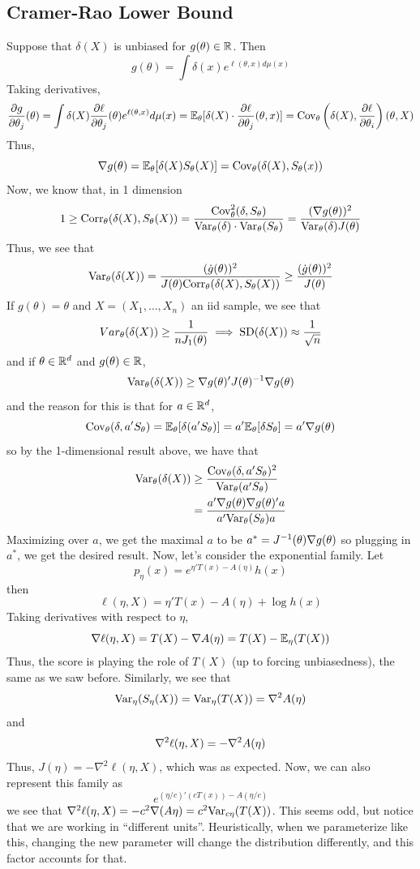 \subsection*{Cramer-Rao Lower Bound}
\sectionspace
Suppose that $\delta(X)$ is unbiased for $g(\theta) \in \R$. Then
\[ g(\theta) = \int \delta(x)e^{\ell(\theta, x)d\mu(x)} \]
Taking derivatives, 
\[ \frac{\del g}{\del \theta_j}(\theta) = \int \delta(X) \frac{\del \ell}{\del \theta_j}(\theta)e^{\ell(\theta, x)}d\mu(x) = \bb{E}_{\theta}[\delta(X) \cdot \frac{\del \ell}{\del \theta_j}(\theta, x)] = \Cov_{\theta}\left(\delta(X), \frac{\del \ell}{\del \theta_i}\right)(\theta, X)\]
Thus, 
\[ \grad g(\theta) = \bb{E}_{\theta}[\delta(X) S_{\theta}(X)] = \Cov_{\theta}(\delta(X), S_{\theta}(x)) \]
Now, we know that, in 1 dimension
\[ 1 \geq \tt{Corr}_{\theta}(\delta(X), S_{\theta}(X)) = \frac{\Cov_{\theta}^2(\delta, S_{\theta})}{\Var_{\theta}(\delta) \cdot \Var_{\theta}(S_{\theta})} = \frac{(\grad g(\theta))^2}{\Var_{\theta}(\delta)J(\theta)} \]
Thus, we see that
\[ \Var_{\theta}(\delta(X)) = \frac{(\dot{g}(\theta))^2}{J(\theta) \tt{Corr}_{\theta}(\delta(X), S_{\theta}(X))} \geq  \frac{(\dot{g}(\theta))^2}{J(\theta)}\]
If $g(\theta) = \theta$ and $X = (X_1, \ldots, X_n)$ an iid sample, we see that
\[ Var_{\theta}(\delta(X)) \geq \frac{1}{nJ_{1}(\theta)} \implies \tt{SD}(\delta(X)) \approx \frac{1}{\sqrt{n}} \]
and if $\theta \in \R^{d}$ and $g(\theta) \in \R$, 
\[ \Var_{\theta}(\delta(X)) \geq \nabla g(\theta)'J(\theta)^{-1}\grad g(\theta) \]
and the reason for this is that for $a \in \R^d$, 
\[ \Cov_{\theta}(\delta, a'S_{\theta}) =  \bb{E}_{\theta}[\delta(a'S_{\theta})] = a'\bb{E}_{\theta}[\delta S_{\theta}] = a'\nabla g(\theta) \]
so by the 1-dimensional result above, we have that
\begin{align*}
    \Var_{\theta}(\delta(X)) &\geq \frac{\Cov_{\theta}(\delta, a'S_{\theta})^2}{\Var_{\theta}(a'S_{\theta})}\\
    &= \frac{a' \grad g(\theta) \grad g(\theta)' a}{a' \Var_{\theta}(S_{\theta}) a}
\end{align*}
Maximizing over $a$, we get the maximal $a$ to be $a^{*} = J^{-1}(\theta)\grad g(\theta)$ so plugging in $a^{*}$, we get the desired result. Now, let's consider the exponential family. Let
\[ p_{\eta}(x) = e^{\eta'T(x) - A(\eta)}h(x) \]
then
\[ \ell(\eta, X) = \eta'T(x) - A(\eta) + \log h(x) \]
Taking derivatives with respect to $\eta$, 
\[ \grad \ell(\eta, X) = T(X) - \grad A(\eta) = T(X) - \bb{E}_{\eta}(T(X)) \]
Thus, the score is playing the role of $T(X)$ (up to forcing unbiasedness), the same as we saw before. Similarly, we see that
\[ \Var_{\eta}(S_{\eta}(X)) = \Var_{\eta}(T(X)) = \grad^2 A(\eta)\]
and
\[ \grad^2 \ell(\eta, X) = -\nabla^2 A(\eta) \]
Thus, $J(\eta) = -\nabla^2 \ell(\eta, X)$, which was as expected. Now, we can also represent this family as
\[ e^{(\eta/c)'(cT(x)) - A(\eta/c)} \]
we see that $\nabla^2\ell(\eta, X) = -c^2\nabla(A\eta) = c^2 \Var_{c \eta}(T(X))$. This seems odd, but notice that we are working in ``different units''. Heuristically, when we parameterize like this, changing the new parameter will change the distribution differently, and this factor accounts for that. \\

